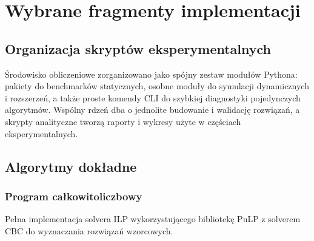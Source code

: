 \chapter{Wybrane fragmenty implementacji}

\section{Organizacja skryptów eksperymentalnych}
Środowisko obliczeniowe zorganizowano jako spójny zestaw modułów
Pythona: pakiety do benchmarków statycznych, osobne moduły do
symulacji dynamicznych i rozszerzeń, a także proste komendy CLI do
szybkiej diagnostyki pojedynczych algorytmów. Wspólny rdzeń dba o
jednolite budowanie i walidację rozwiązań, a skrypty analityczne
tworzą raporty i wykresy użyte w częściach eksperymentalnych.

\section{Algorytmy dokładne}
\subsection{Program całkowitoliczbowy}
Pełna implementacja solvera ILP wykorzystującego bibliotekę PuLP
z solverem CBC do wyznaczania rozwiązań wzorcowych.


